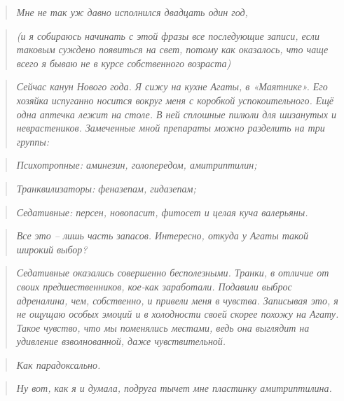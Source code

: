 \documentclass[
  a5paperpaper,
  DIV=11,
  numbers=noendperiod]{scrreprt}
\begin{document}
\begin{quote}
\emph{Мне не так уж давно исполнился двадцать один год, }
\end{quote}

\begin{quote}
\emph{(и я собираюсь начинать с этой фразы все последующие записи, если
таковым суждено появиться на свет, потому как оказалось, что чаще всего
я бываю не в курсе собственного возраста)}
\end{quote}

\begin{quote}
\emph{Сейчас канун Нового года. Я сижу на кухне Агаты, в «Маятнике». Его
хозяйка испуганно носится вокруг меня с коробкой успокоительного. Ещё
одна аптечка лежит на столе. В ней сплошные пилюли для шизанутых и
неврастеников. Замеченные мной препараты можно разделить на три группы:}
\end{quote}

\begin{quote}
\emph{Психотропные: аминезин, голопередом, амитриптилин;}
\end{quote}

\begin{quote}
\emph{Транквилизаторы: феназепам, гидазепам;}
\end{quote}

\begin{quote}
\emph{Седативные: персен, новопасит, фитосет и целая куча валерьяны.}
\end{quote}

\begin{quote}
\emph{Все это -- лишь часть запасов. Интересно, откуда у Агаты такой
широкий выбор? }
\end{quote}

\begin{quote}
\emph{Седативные оказались совершенно бесполезными. Транки, в отличие от
своих предшественников, кое-как заработали. Подавили выброс адреналина,
чем, собственно, и привели меня в чувства. Записывая это, я не ощущаю
особых эмоций и в холодности своей скорее похожу на Агату. Такое
чувство, что мы поменялись местами, ведь она выглядит на удивление
взволнованной, даже чувствительной.}
\end{quote}

\begin{quote}
\emph{Как парадоксально.}
\end{quote}

\begin{quote}
\emph{Ну вот, как я и думала, подруга тычет мне пластинку амитриптилина.
}
\end{quote}
\end{document}
